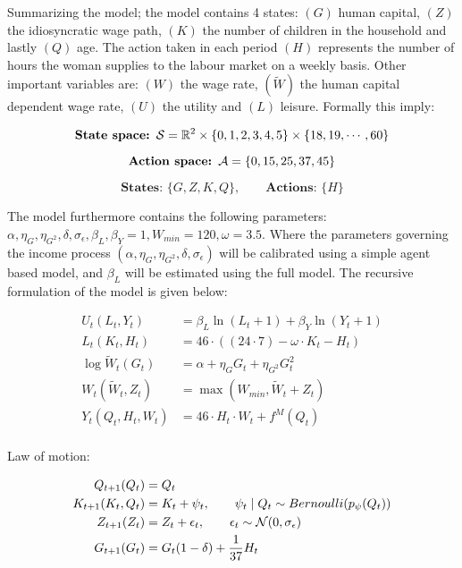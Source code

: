 Summarizing the model; the model contains 4 states: $(G)$ human capital, $(Z)$ the idiosyncratic wage path, $(K)$ the number of children in the household and lastly $(Q)$ age. The action taken in each period $(H)$ represents the number of hours the woman supplies to the labour market on a weekly basis. Other important variables are: $(W)$ the wage rate, $(\tilde{W})$ the human capital dependent wage rate,  $(U)$ the utility and $(L)$ leisure. Formally this imply:

\begin{equation}
    \textbf{State space: }\mathcal{S} = \mathbb{R}^{2} \times \{0, 1, 2, 3, 4, 5\} \times \{ 18, 19, \cdots, 60\}
\end{equation}

\begin{equation}
    \textbf{Action space: }\mathcal{A}  = \{0, 15, 25, 37, 45\} 
\end{equation}

\begin{equation}
    \textbf{States: }\{G, Z, K, Q\}, \qquad \textbf{Actions: } \{H\} 
\end{equation}

The model furthermore contains the following parameters: $\alpha, \eta_G, \eta_{G^2}, \delta, \sigma_\epsilon, \beta_L, \beta_Y=1, W_{min}=120, \omega=3.5$. Where the parameters governing the income process $(\alpha, \eta_G, \eta_{G^2}, \delta, \sigma_\epsilon)$ will be calibrated using a simple agent based model, and $\beta_L$ will be estimated using the full model. The recursive formulation of the model is given below:

\begin{align}
    U_t(L_t, Y_t) &= \beta_L \ln(L_t + 1) + \beta_Y \ln(Y_t + 1) \label{eq:utility_v1}\\
    L_t(K_t, H_t) &= 46 \cdot ((24 \cdot 7) - \omega \cdot K_t  - H_t) \label{eq:leissure_v1}\\
    \log \tilde{W}_t (G_t) &= \alpha + \eta_G G_t + \eta_{G^2} G_t^2 \label{eq:salary_tilde_v1}\\
    W_t(\tilde{W}_t, Z_t) &= \max(W_{min} , \tilde{W}_t  + Z_t)  \label{eq:salary_v1}\\
    Y_t(Q_t,H_t, W_t) &= 46 \cdot H_t \cdot W_t + f^M(Q_t) \label{eq:total_salary_v1}\\
\end{align}

Law of motion:

\begin{align}
    Q_{t+1}(Q_t) &= Q_t \label{eq:age_v1}\\
    K_{t+1}(K_t, Q_t)  &= K_{t} + \psi_t, \qquad \psi_t \mid Q_t \sim Bernoulli(p_\psi(Q_t)) \label{eq:fertility_v1} \\
    Z_{t+1}(Z_t) &= Z_t + \epsilon_t, \qquad \epsilon_t \sim \mathcal{N}(0, \sigma_\epsilon) \label{eq:idiosyncratic_wage_path_v1}\\
    G_{t+1}(G_t) &= G_t(1 - \delta) + \frac{1}{37} H_t \\
\end{align}


